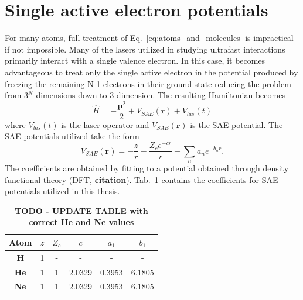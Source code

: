 \section{Single active electron potentials}
\label{sec:SAE}
For many atoms, full treatment of Eq.~\ref{eq:atoms_and_molecules} is impractical if not impossible. Many of the lasers utilized in studying ultrafast interactions primarily interact with a single valence electron. In this case, it becomes advantageous to treat only the single active electron in the potential produced by freezing the remaining N-1 electrons in their ground state reducing the problem from $3^N$-dimensions down to 3-dimension. The resulting Hamiltonian becomes
\begin{equation}
  \label{eq:SAE_TDSE}
  \hat{H} = -\frac{\mathbf{p}^2}{2} + V_{SAE}(\mathbf{r}) + V_{las}(t)
\end{equation}
where $V_{las}(t)$ is the laser operator and $V_{SAE}(\mathbf{r})$ is the SAE potential. The SAE potentials utilized take the form
\begin{equation}
  \label{eq:SAE_pot}
  V_{SAE}(\mathbf{r}) = - \frac{z}{r} - \frac{Z_c e^{-c r}}{r} - \sum_n a_n e^{-b_n r}.
\end{equation}
The coefficients are obtained by fitting to a potential obtained through density functional theory (DFT, \textbf{citation}).  Tab.~\ref{tab:SAE} contains the coefficients for SAE potentials utilized in this thesis.
\begin{table}
\begin{center}
 \begin{tabular}{|c | c | c | c | c | c|} 
 \hline
 \textbf{Atom} & $z$ & $Z_c$ & $c$ & $a_1$ & $b_1$ \\
 \hline
 \textbf{H} & 1 & - & - &  - & - \\ 
 \hline
 \textbf{He} & 1 & 1 & 2.0329 &  0.3953 & 6.1805 \\ 
 \hline
 \textbf{Ne} & 1 & 1 & 2.0329 &  0.3953 & 6.1805 \\ 
 \hline
\end{tabular}
\end{center}
 \caption{\textbf{TODO - UPDATE TABLE with correct He and Ne values}}
 \label{tab:SAE}
\end{table}


